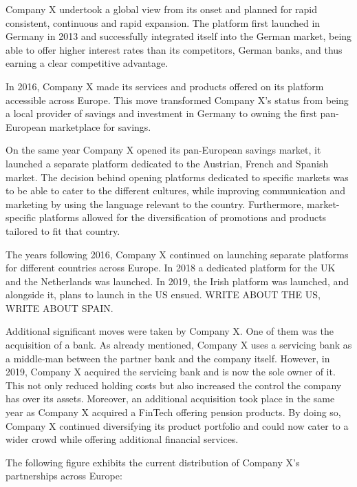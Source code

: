 \documentclass[11pt,a4paper]{article}
\begin{document}
{{Company X undertook a global view from its onset and planned for rapid consistent, continuous and rapid expansion. The platform first launched in Germany in 2013 and successfully integrated itself into the German market, being able to offer higher interest rates than its competitors, German banks, and thus earning a clear competitive advantage. \par
In 2016, Company X made its services and products offered on its platform accessible across Europe. This move transformed Company X's status from being a local provider of savings and investment in Germany to owning the first pan-European marketplace for savings. \par
On the same year Company X opened its pan-European savings market, it launched a separate platform dedicated to the Austrian, French and Spanish market. The decision behind opening platforms dedicated to specific markets was to be able to cater to the different cultures, while improving communication and marketing by using the language relevant to the country. Furthermore, market-specific platforms allowed for the diversification of promotions and products tailored to fit that country. \par 
The years following 2016, Company X continued on launching separate platforms for different countries across Europe. In 2018 a dedicated platform for the UK and the Netherlands was launched. In 2019, the Irish platform was launched, and alongside it, plans to launch in the US ensued. WRITE ABOUT THE US, WRITE ABOUT SPAIN. \par
Additional significant moves were taken by Company X. One of them was the acquisition of a bank. As already mentioned, Company X uses a servicing bank as a middle-man between the partner bank and the company itself. However, in 2019, Company X acquired the servicing bank and is now the sole owner of it. This not only reduced holding costs but also increased the control the company has over its assets. Moreover, an additional acquisition took place in the same year as Company X acquired a FinTech offering pension products. By doing so, Company X continued diversifying its product portfolio and could now cater to a wider crowd while offering additional financial services. \par

The following figure exhibits the current distribution of Company X's partnerships across Europe:

}}
\end{document}
